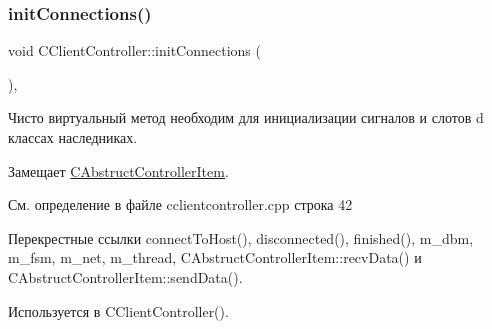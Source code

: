 \subsubsection{\texorpdfstring{init\+Connections()}{initConnections()}}
{\footnotesize\ttfamily void C\+Client\+Controller\+::init\+Connections (\begin{DoxyParamCaption}{ }\end{DoxyParamCaption})\hspace{0.3cm}{\ttfamily [protected]}, {\ttfamily [virtual]}}



Чисто виртуальный метод необходим для инициализации сигналов и слотов d классах наследниках. 



Замещает \hyperlink{class_c_abstruct_controller_item_a27c6889230a86cb0782e6d7596b883c1}{C\+Abstruct\+Controller\+Item}.



См. определение в файле cclientcontroller.\+cpp строка 42



Перекрестные ссылки connect\+To\+Host(), disconnected(), finished(), m\+\_\+dbm, m\+\_\+fsm, m\+\_\+net, m\+\_\+thread, C\+Abstruct\+Controller\+Item\+::recv\+Data() и C\+Abstruct\+Controller\+Item\+::send\+Data().



Используется в C\+Client\+Controller().


